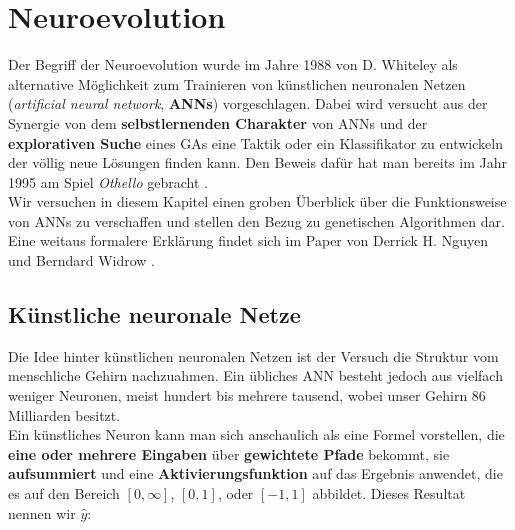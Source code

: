     \section{Neuroevolution} \label{neural-evo-definition}
        Der Begriff der Neuroevolution wurde im Jahre 1988 von D. Whiteley \cite{whiteley88} als alternative Möglichkeit zum Trainieren von künstlichen neuronalen Netzen (\textit{artificial neural network}, \textbf{ANNs}) vorgeschlagen. Dabei wird versucht aus der Synergie von dem \textbf{selbstlernenden Charakter} von ANNs und der \textbf{explorativen Suche} eines GAs eine Taktik oder ein Klassifikator zu entwickeln der völlig neue Lösungen finden kann. Den Beweis dafür hat man bereits im Jahr 1995 am Spiel \textit{Othello} gebracht \cite{othello95}. \\[2mm]
        \noindent
        Wir versuchen in diesem Kapitel einen groben Überblick über die Funktionsweise von ANNs zu verschaffen und stellen den Bezug zu genetischen Algorithmen dar. Eine weitaus formalere Erklärung findet sich im Paper von Derrick H. Nguyen und Berndard Widrow \cite{neuralnetwork-overview}.

        \subsection{Künstliche neuronale Netze}

            Die Idee hinter künstlichen neuronalen Netzen ist der Versuch die Struktur vom menschliche Gehirn nachzuahmen. Ein übliches ANN besteht jedoch aus vielfach weniger Neuronen, meist hundert bis mehrere tausend, wobei unser Gehirn 86 Milliarden\cite{brainsize} besitzt.\\
            \noindent
            Ein künstliches Neuron kann man sich anschaulich als eine Formel vorstellen, die \textbf{eine oder mehrere Eingaben} über \textbf{gewichtete Pfade} bekommt, sie \textbf{aufsummiert} und eine \textbf{Aktivierungsfunktion} auf das Ergebnis anwendet, die es auf den Bereich $[0,\infty]$, $[0,1]$, oder $[-1,1]$ abbildet. Dieses Resultat nennen wir $\hat{y}$:

